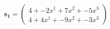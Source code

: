 \documentclass[preview]{standalone}
\begin{document}
\begin{align*}
\mathbf{s_1} = \begin{pmatrix}4 + -2x^{1} + 7x^{2} + -5x^{3} \\ 4 + 4x^{1} + -9x^{2} + -3x^{3}\end{pmatrix}
\end{align*}
\end{document}
